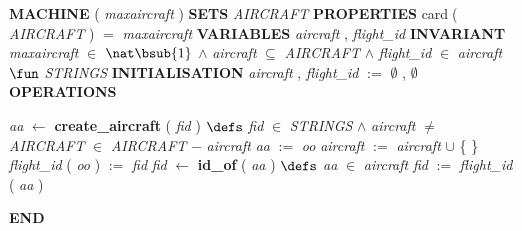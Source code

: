 %
\bsetindent
\begin{tabbing}
\bSetTabs
%
%
\bbnl
{\bf MACHINE} \bhsp{} ( {\em maxaircraft\/} )  \-\label{Aircraft}
%
%
\bbnl
{\bf SETS} \+ \bbnl
{\em AIRCRAFT\/}\label{AIRCRAFT}  \label{STRINGS}  \-
%
%
\bbnl
{\bf PROPERTIES} \+ \bbnl
 {\sf card}$\;$( {\em AIRCRAFT\/} )  $=$ {\em maxaircraft\/} \-
%
%
\bbnl
{\bf VARIABLES} \+ \bbnl
{\em aircraft\/}\label{aircraft}  , {\em flight\_id\/}\label{flight_id}  \-
%
%
\bbnl
{\bf INVARIANT} \+ \bbnl
{\em maxaircraft\/} $\in$  $\nat\bsub{1}$  $\wedge$ \bnl
{\em aircraft\/} $\subseteq$ {\em AIRCRAFT\/} $\wedge$ \bnl
{\em flight\_id\/} $\in$ {\em aircraft\/} $\fun$ {\em STRINGS\/} \-
%
%
\bbnl
{\bf INITIALISATION} \+ \bbnl
{\em aircraft\/} , {\em flight\_id\/} $:=$   $\emptyset$  ,  $\emptyset$  \-
%
%
\bnl\bnl
{\bf OPERATIONS} \+ \bbnl

%
%
{\em aa\/} $\longleftarrow$  {\bf { create\_aircraft}} ( {\em fid\/} ) \bhsp $\defs$ \+ \bnl
  \+\bnl
{\em fid\/} $\in$ {\em STRINGS\/} $\wedge$ \bnl
{\em aircraft\/} $\neq$ {\em AIRCRAFT\/} \-\bnl
{} \+\bnl
{}  \-\bnl
{}  $\in$ {\em AIRCRAFT\/} $-$ {\em aircraft\/} \-\bnl
{} \+\bnl
{\em aa\/} $:=$  {\em oo\/} \bparallel \bnl
{\em aircraft\/} $:=$  {\em aircraft\/} $\cup$  \{  \- \}  \bparallel \bnl
{\em flight\_id\/} ( {\em oo\/} )  $:=$  {\em fid\/} \-\bnl
{}  \-\bnl
{}  \- \bOperationSemiColon \bbnl
%
%
{\em fid\/} $\longleftarrow$  {\bf { id\_of}} ( {\em aa\/} ) \bhsp $\defs$ \+ \bnl
  \+\bnl
{\em aa\/} $\in$ {\em aircraft\/} \-\bnl
{} \+\bnl
{\em fid\/} $:=$  {\em flight\_id\/} ( {\em aa\/} )  \-\bnl
{}  \-\- \bbnl

%
%
\bbnl
{\bf END} 
\end{tabbing}
\bresetindent
